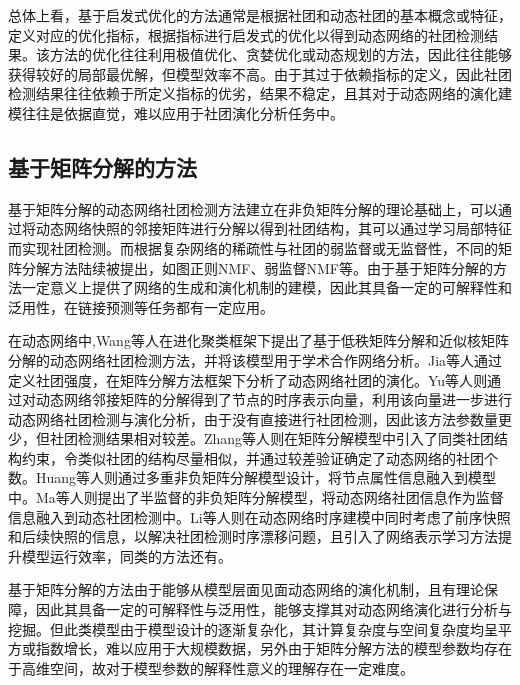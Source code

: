 总体上看，基于启发式优化的方法通常是根据社团和动态社团的基本概念或特征，定义对应的优化指标，根据指标进行启发式的优化以得到动态网络的社团检测结果。该方法的优化往往利用极值优化、贪婪优化或动态规划的方法，因此往往能够获得较好的局部最优解，但模型效率不高。由于其过于依赖指标的定义，因此社团检测结果往往依赖于所定义指标的优劣，结果不稳定，且其对于动态网络的演化建模往往是依据直觉，难以应用于社团演化分析任务中。



\subsection{基于矩阵分解的方法}
基于矩阵分解的动态网络社团检测方法建立在非负矩阵分解的理论基础上，可以通过将动态网络快照的邻接矩阵进行分解以得到社团结构，其可以通过学习局部特征而实现社团检测\cite{lee1999learning}。而根据复杂网络的稀疏性与社团的弱监督或无监督性，不同的矩阵分解方法陆续被提出，如图正则NMF\cite{cai2010graph}、弱监督NMF\cite{choo2015weakly}等。由于基于矩阵分解的方法一定意义上提供了网络的生成和演化机制的建模，因此其具备一定的可解释性和泛用性，在链接预测\cite{ma2017nonnegative}等任务都有一定应用。

在动态网络中,Wang等人\cite{wang2010low}在进化聚类框架下提出了基于低秩矩阵分解和近似核矩阵分解的动态网络社团检测方法，并将该模型用于学术合作网络分析。Jia等人\cite{jia2014analysis}通过定义社团强度，在矩阵分解方法框架下分析了动态网络社团的演化。Yu等人\cite{yu2017temporally}则通过对动态网络邻接矩阵的分解得到了节点的时序表示向量，利用该向量进一步进行动态网络社团检测与演化分析，由于没有直接进行社团检测，因此该方法参数量更少，但社团检测结果相对较差。Zhang等人\cite{zhang2012common}则在矩阵分解模型中引入了同类社团结构约束，令类似社团的结构尽量相似，并通过较差验证确定了动态网络的社团个数。Huang等人\cite{huang2016clustering}则通过多重非负矩阵分解模型设计，将节点属性信息融入到模型中。Ma等人\cite{ma2017evolutionary}则提出了半监督的非负矩阵分解模型，将动态网络社团信息作为监督信息融入到动态社团检测中。Li等人\cite{li2021detecting}则在动态网络时序建模中同时考虑了前序快照和后续快照的信息，以解决社团检测时序漂移问题，且引入了网络表示学习方法提升模型运行效率，同类的方法还有\cite{li2021identification}。

基于矩阵分解的方法由于能够从模型层面见面动态网络的演化机制，且有理论保障，因此其具备一定的可解释性与泛用性，能够支撑其对动态网络演化进行分析与挖掘。但此类模型由于模型设计的逐渐复杂化，其计算复杂度与空间复杂度均呈平方或指数增长，难以应用于大规模数据，另外由于矩阵分解方法的模型参数均存在于高维空间，故对于模型参数的解释性意义的理解存在一定难度。

